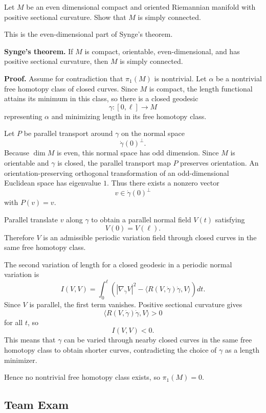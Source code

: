 \begin{exercise}
\label{geometry:2018:6}
Let $M$ be an even dimensional compact and oriented Riemannian manifold with positive sectional curvature. Show that $M$ is simply connected.
\end{exercise}

\begin{solution}
This is the even-dimensional part of Synge's theorem.

\textbf{Synge's theorem.}
If $M$ is compact, orientable, even-dimensional, and has positive sectional curvature, then $M$ is simply connected.

\textbf{Proof.}
Assume for contradiction that $\pi_1(M)$ is nontrivial. Let $\alpha$ be a nontrivial free homotopy class of closed curves. Since $M$ is compact, the length functional attains its minimum in this class, so there is a closed geodesic
\[
\gamma:[0,\ell]\to M
\]
representing $\alpha$ and minimizing length in its free homotopy class.

Let $P$ be parallel transport around $\gamma$ on the normal space
\[
\dot\gamma(0)^\perp.
\]
Because $\dim M$ is even, this normal space has odd dimension. Since $M$ is orientable and $\gamma$ is closed, the parallel transport map $P$ preserves orientation. An orientation-preserving orthogonal transformation of an odd-dimensional Euclidean space has eigenvalue $1$. Thus there exists a nonzero vector
\[
v\in \dot\gamma(0)^\perp
\]
with $P(v)=v$.

Parallel translate $v$ along $\gamma$ to obtain a parallel normal field $V(t)$ satisfying
\[
V(0)=V(\ell).
\]
Therefore $V$ is an admissible periodic variation field through closed curves in the same free homotopy class.

The second variation of length for a closed geodesic in a periodic normal variation is
\[
I(V,V)=\int_0^\ell
\left(|\nabla_{\dot\gamma}V|^2
-\langle R(V,\dot\gamma)\dot\gamma,V\rangle
\right)dt.
\]
Since $V$ is parallel, the first term vanishes. Positive sectional curvature gives
\[
\langle R(V,\dot\gamma)\dot\gamma,V\rangle>0
\]
for all $t$, so
\[
I(V,V)<0.
\]
This means that $\gamma$ can be varied through nearby closed curves in the same free homotopy class to obtain shorter curves, contradicting the choice of $\gamma$ as a length minimizer.

Hence no nontrivial free homotopy class exists, so $\pi_1(M)=0$.
\end{solution}

\subsection{Team Exam}

